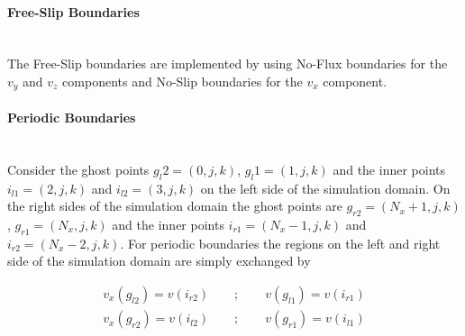 \paragraph{Free-Slip Boundaries}\mbox{}\\

The Free-Slip boundaries are implemented by using No-Flux boundaries for
the $v_y$ and $v_z$ components and No-Slip boundaries for the $v_x$ component.

\paragraph{Periodic Boundaries}\mbox{}\\

Consider the ghost points $g_l2=(0, j, k)$, $g_l1=(1, j, k)$ and the inner points $i_{l1}=(2, j, k)$ and $i_{l2}=(3, j, k)$ on the left side of
the simulation domain.
On the right sides of the simulation domain the ghost points are $g_{r2}=(N_x+1, j, k)$, $g_{r1}=(N_x, j, k)$
and the inner points $i_{r1}=(N_x-1, j, k)$ and $i_{r2}=(N_x - 2, j, k)$.
For periodic boundaries the regions on the left and right side of the simulation domain are simply exchanged by

\begin{align}
    v_x(g_{l2}) = v(i_{r2}) \qquad ; \qquad v(g_{l1}) = v(i_{r1})\\
    v_x(g_{r2}) = v(i_{l2}) \qquad ; \qquad v(g_{r1}) = v(i_{l1})
\end{align}


%
%



